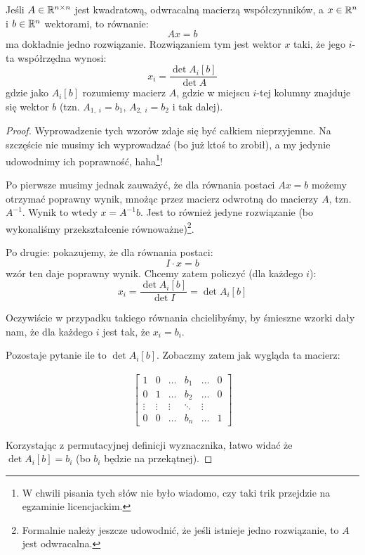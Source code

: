 \begin{theorem}
	Jeśli \(A \in \mathbb{R}^{n \times n}\) jest kwadratową, odwracalną macierzą współczynników, a \(x \in \mathbb{R}^n\) i \(b \in \mathbb{R}^n\) wektorami, to równanie:
	\[
		Ax = b
	\]
	ma dokładnie jedno rozwiązanie. Rozwiązaniem tym jest wektor \(x\) taki, że jego \(i\)-ta współrzędna wynosi:
	\[
		x_i = \frac{\det{A_i[b]}}{\det{A}}
	\]
	gdzie jako \(A_i[b]\) rozumiemy macierz \(A\), gdzie w miejscu \(i\)-tej kolumny znajduje się wektor \(b\) (tzn. \(A_{1, \; i} = b_1\), \(A_{2, \; i} = b_2\) i tak dalej).
\end{theorem}
\begin{proof}
	Wyprowadzenie tych wzorów zdaje się być całkiem nieprzyjemne. Na szczęście nie musimy ich wyprowadzać (bo już ktoś to zrobił), a my jedynie udowodnimy ich poprawność, haha\footnote{W chwili pisania tych słów nie było wiadomo, czy taki trik przejdzie na egzaminie licencjackim.}!

	Po pierwsze musimy jednak zauważyć, że dla równania postaci \(Ax = b\) możemy otrzymać poprawny wynik, mnożąc przez macierz odwrotną do macierzy \(A\), tzn. \(A^{-1}\). Wynik to wtedy \(x = A^{-1}b\). Jest to również jedyne rozwiązanie (bo wykonaliśmy przekształcenie równoważne)\footnote{Formalnie należy jeszcze udowodnić, że jeśli istnieje jedno rozwiązanie, to \(A\) jest odwracalna.}.

	Po drugie: pokazujemy, że dla równania postaci:
	\[
		I \cdot x = b
	\]
	wzór ten daje poprawny wynik. Chcemy zatem policzyć (dla każdego \(i\)):
	\[
		x_i = \frac{\det{A_i[b]}}{\det{I}} = \det{A_i[b]}
	\]

	Oczywiście w przypadku takiego równania chcielibyśmy, by śmieszne wzorki dały nam, że dla każdego \(i\) jest tak, że \(x_i = b_i\).

	Pozostaje pytanie ile to \( \det{A_i[b]} \). Zobaczmy zatem jak wygląda ta macierz:

	\begin{align*}
		\begin{bmatrix}
			1      & 0      & \dots  & b_1    & \dots  & 0 \\
			0      & 1      & \dots  & b_2    & \dots  & 0 \\
			\vdots & \vdots & \vdots & \ddots & \vdots     \\
			0      & 0      & \dots  & b_n    & \dots  & 1
		\end{bmatrix}
	\end{align*}

	Korzystając z permutacyjnej definicji wyznacznika, łatwo widać że \( \det{A_i[b]} = b_i \) (bo \(b_i\) będzie na przekątnej).


\end{proof}
